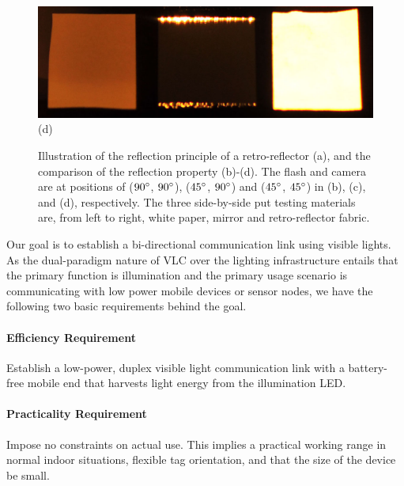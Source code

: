 \begin{figure}[tb]
        \includegraphics[width=0.8\columnwidth]{fig/tx45-rx45.JPG} (d)
\endminipage \hfill
    \caption{Illustration of the reflection principle of a retro-reflector (a), and the comparison of the reflection property (b)-(d). The flash and camera are at positions of ($90\degree$, $90\degree$), ($45\degree$, $90\degree$) and ($45\degree$, $45\degree$) in (b), (c), and (d), respectively. The three side-by-side put testing materials are, from left to right, white paper, mirror and retro-reflector fabric. %
    }\label{fig:retro-reflector}
\end{figure}




Our goal is to establish a bi-directional communication link using visible lights. As the dual-paradigm nature of VLC over the lighting infrastructure entails that the primary function is illumination and the primary usage scenario is communicating with low power mobile devices or sensor nodes, we have the following two basic requirements behind the goal. 
\begin{Itemize}
\item \paragraph{Efficiency Requirement}
Establish a low-power, duplex visible light communication link with a battery-free mobile end that harvests light energy from the illumination LED. 
\item \paragraph{Practicality Requirement}
Impose no constraints on actual use. This implies a practical working range in normal indoor situations, flexible tag orientation, and that the size of the device be small.
\end{Itemize}

